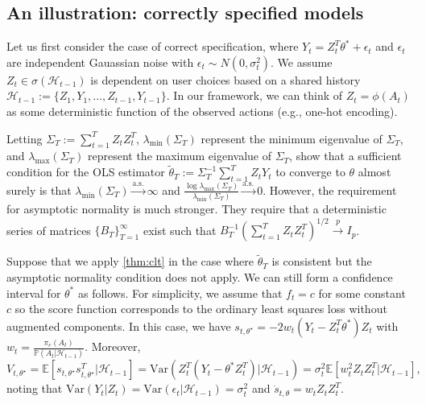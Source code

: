 \documentclass[11pt]{article}
\newcommand{\E}{\mathbb{E}}
\newcommand{\Var}{\mathrm{Var}}
\begin{document}
\subsection*{An illustration: correctly specified models}

Let us first consider the case of correct specification, where $Y_{t} = Z_{t}^{T}\theta^{*}  +\epsilon_{t}$ and $\epsilon_{t}$ are independent Gauassian noise with $\epsilon_{t} \sim N(0,\sigma_{t}^{2})$. We assume $Z_{t} \in \sigma(\mathcal{H}_{t-1})$ is dependent on user choices based on a shared history $\mathcal{H}_{t-1} := \{ Z_{1},Y_{1},...,Z_{t-1},Y_{t-1}\}$. In our framework, we can think of $Z_{t} = \phi(A_t)$ as some deterministic function of the observed actions (e.g., one-hot encoding). 

Letting $\Sigma_{T} := \sum_{t=1}^{T} Z_{t}Z_{t}^{T}$, $\lambda_{\text{min}}(\Sigma_{T})$ represent the minimum eigenvalue of $\Sigma_T$, and $\lambda_{\text{max}}(\Sigma_{T})$ represent the maximum eigenvalue of $\Sigma_T$, \cite{1982laiwei} show that a sufficient condition for the OLS estimator $\tilde{\theta}_{T}:= \Sigma_{T}^{-1} \sum_{t=1}^{T} Z_{t}Y_{t} $ to converge to $\theta$ almost surely is that $\lambda_{\text{min}}(\Sigma_{T}) \overset{\text{a.s.}}{\to} \infty $ and $\frac{\log\lambda_{\text{max}} (\Sigma_{T})}{ \lambda_{\text{min}}(\Sigma_{T})} \overset{\text{a.s.}}{\to} 0 $. However, the requirement for asymptotic normality is much stronger. They require that a deterministic series of matrices $\{B_{T} \}_{T=1}^{\infty}$ exist such that $B_{T}^{-1} (\sum_{t=1}^{T} Z_{t}Z_{t}^{T})^{1/2} \overset{p}{\to} I_{p}$. 

Suppose that we apply \cref{thm:clt} in the case where $\tilde{\theta}_{T}$ is consistent but the asymptotic normality condition does not apply. We can still form a confidence interval for $\theta^*$ as follows. For simplicity, we assume that $f_{t} = c$ for some constant $c$ so the score function corresponds to the ordinary least squares loss without augmented components. In this case, we have $s_{t,\theta^{\star}} = - 2w_{t}(Y_{t} - Z_{t}^{T}\theta^{*} )Z_{t}$ with $w_{t} =\frac{\pi_{e}(A_{t})}{ \mathbb{P} (A_{t}  | \mathcal{H}_{t-1}) }$. Moreover, $$V_{t,\theta^{\star}} = \E\left[s_{t,\theta^{\star}}s_{t,\theta^{\star}}^{T} | \mathcal{H}_{t-1} \right] =\Var\left(Z_{t}^{T}(Y_{t} - \theta^{*}Z_{t}^{T})|\mathcal{H}_{t-1} \right) = \sigma_{t}^{2} \E \left[w_{t}^{2}Z_{t}Z_{t}^{T} |\mathcal{H}_{t-1} \right],$$ noting that $\text{Var} \left(Y_{t} | Z_{t} \right) =  \text{Var} \left(\epsilon_{t} |\mathcal{H}_{t-1}\right) =\sigma_{t}^{2}$ and $\dot{s}_{t,\theta} = w_{t}Z_{t}Z_{t}^{T}$.
\end{document}
